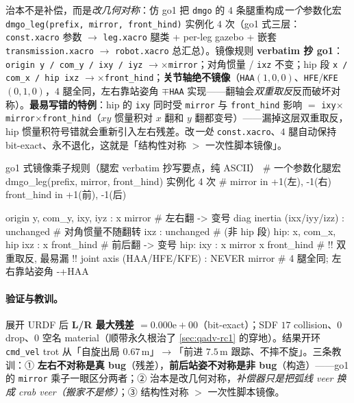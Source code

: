 \begin{insight}\label{ins:qadv-leg-macro}
治本不是补偿，而是\emph{改几何对称}：仿 go1 把 \texttt{dmgo} 的 $4$ 条腿重构成\emph{一个}参数化宏 \texttt{dmgo\_leg(prefix, mirror, front\_hind)} 实例化 $4$ 次（go1 式三层：\texttt{const.xacro} 参数 $\to$ \texttt{leg.xacro} 腿类 + per-leg gazebo + 嵌套 \texttt{transmission.xacro} $\to$ \texttt{robot.xacro} 总汇总）。镜像规则 \textbf{verbatim 抄 go1}：\texttt{origin y / com\_y / ixy / iyz} $\to\times$\texttt{mirror}；对角惯量 / \texttt{ixz} 不变；hip 段 \texttt{x / com\_x / hip ixz} $\to\times$\texttt{front\_hind}；\textbf{关节轴绝不镜像}（\texttt{HAA}$(1,0,0)$、\texttt{HFE}/\texttt{KFE}$(0,1,0)$，$4$ 腿全同，左右靠站姿角 $\mp$\texttt{HAA} 实现——翻轴会\emph{双重取反}反而破坏对称）。\textbf{最易写错的特例}：hip 的 \texttt{ixy} 同时受 \texttt{mirror} 与 \texttt{front\_hind} 影响 $=$ \texttt{ixy}$\times$\texttt{mirror}$\times$\texttt{front\_hind}（$xy$ 惯量积对 $x$ 翻和 $y$ 翻都变号）——漏掉这层双重取反，hip 惯量积符号错就会重新引入左右残差。改\emph{一处} \texttt{const.xacro}、$4$ 腿自动保持 bit-exact、永不退化，这就是「结构性对称 $>$ 一次性脚本镜像」。
\end{insight}

\begin{codebox}[text]{go1 式镜像乘子规则（腿宏 verbatim 抄写要点，纯 ASCII）}
# 一个参数化腿宏 dmgo_leg(prefix, mirror, front_hind) 实例化 4 次
# mirror     in {+1(左), -1(右)}   front_hind in {+1(前), -1(后)}

origin y, com_y, ixy, iyz   :  x mirror            # 左右翻 -> 变号
diag inertia (ixx/iyy/izz)  :  unchanged           # 对角惯量不随翻转
ixz                         :  unchanged           # (非 hip 段)
hip: x, com_x, hip ixz      :  x front_hind         # 前后翻 -> 变号
hip: ixy                    :  x mirror x front_hind # !! 双重取反, 最易漏 !!
joint axis (HAA/HFE/KFE)    :  NEVER mirror          # 4 腿全同; 左右靠站姿角 -+HAA
\end{codebox}

\paragraph{验证与教训。}
展开 URDF 后 \textbf{L/R 最大残差 $=0.000\mathrm{e}{+}00$}（bit-exact）；SDF $17$ collision、$0$ drop、$0$ 空名 material（顺带永久根治了 \cref{sec:qadv-rc1} 的穿地）。结果开环 \texttt{cmd\_vel} trot 从「自旋出局 $0.67$\,m」$\to$「前进 $7.5$\,m 跟踪、不摔不旋」。三条教训：① \textbf{左右不对称是真 bug}（残差），\textbf{前后站姿不对称是非 bug}（构造）——go1 的 \texttt{mirror} 乘子一眼区分两者；② 治本是改几何对称，\emph{补偿器只是把弧线 veer 换成 crab veer（搬家不是修）}；③ 结构性对称 $>$ 一次性脚本镜像。

